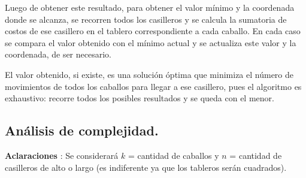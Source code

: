 Luego de obtener este resultado, para obtener el valor mínimo y la
coordenada donde se alcanza, se recorren todos los casilleros y se calcula
la sumatoria de costos de ese casillero en el tablero correspondiente a cada
caballo. En cada caso se compara el valor obtenido con el mínimo actual y se
actualiza este valor y la coordenada, de ser necesario.

El valor obtenido, si existe, es una solución óptima que minimiza el número
de movimientos de todos los caballos para llegar a ese casillero, pues el
algoritmo es exhaustivo: recorre todos los posibles resultados y se queda
con el menor.



\newpage
\subsection{Análisis de complejidad.}

\vspace*{0.3cm}

\textbf{Aclaraciones} : Se considerará $k$ = cantidad de caballos
 y $n$ = cantidad de casilleros de alto o largo (es indiferente ya que los
 tableros serán cuadrados).


